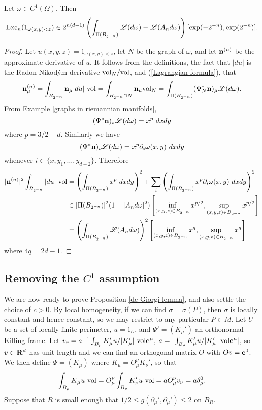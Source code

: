 \begin{lemma}\label{excess vs plateau energy}
Let $\omega \in C^1(\Omega)$. Then
\begin{equation}
    \operatorname{Exc}_n(1_{\omega(x, y) < z}) \in 2^{n(d - 1)} \left(\int_{\Pi(B_{2^{-n}})} \mathscr L(d\omega) - \mathscr L(A_n d\omega)\right) [\exp(-2^{-n}), \exp(2^{-n})]. \label{excess vs Lagrangian}
\end{equation}
\end{lemma}
\begin{proof}
Let $u(x, y, z) = 1_{\omega(x, y) < z}$, let $N$ be the graph of $\omega$, and let $\mathbf n^{(n)}$ be the approximate derivative of $u$.
It follows from the definitions, the fact that $|du|$ is the Radon-Nikod\'ym derivative $\mathrm{vol}_N/\mathrm{vol}$, and (\ref{Lagrangian formula}), that 
$$\mathbf n^{(n)}_\mu = \int_{B_{2^{-n}}} \mathbf n_\mu |du| ~\mathrm{vol} = \int_{B_{2^{-n}} \cap N} \mathbf n_\mu \mathrm{vol}_N = \int_{\Pi(B_{2^{-n}})} (\Psi_N^* \mathbf n)_\mu \mathscr L(d\omega).$$
From Example \ref{graphs in riemannian manifolds}, 
$$(\Psi^* \mathbf n)_z \mathscr L(d\omega) = x^p ~dxdy$$
where $p = 3/2 - d$. Similarly we have 
$$(\Psi^* \mathbf n)_i \mathscr L(d\omega) = x^p \partial_i \omega(x, y) ~dxdy$$
whenever $i \in \{x, y_1, \dots, y_{d - 2}\}$.
Therefore 
\begin{align*}
    |\mathbf n^{(n)}|^2 \int_{B_{2^{-n}}} |du| ~\mathrm{vol} &= \left(\int_{\Pi(B_{2^{-n}})} x^p ~dxdy\right)^2 + \sum_i \left(\int_{\Pi(B_{2^{-n}})} x^p \partial_i \omega(x, y) ~dxdy \right)^2 \\
    &\in |\Pi(B_{2^{-n}})|^2 (1 + |A_nd\omega|^2) \left[\inf_{(x, y, z) \in B_{2^{-n}}} x^{p/2}, \sup_{(x, y, z) \in B_{2^{-n}}} x^{p/2}\right] \\
    &= \left(\int_{\Pi(B_{2^{-n}})} \mathscr L(A_nd\omega)\right)^2 \left[\inf_{(x, y, z) \in B_{2^{-n}}} x^q, \sup_{(x, y, z) \in B_{2^{-n}}} x^q\right] 
\end{align*}
where $4q = 2d - 1$. 
\end{proof}


\subsection{Removing the \texorpdfstring{$C^1$}{C1} assumption}\label{proof of DGL}
We are now ready to prove Proposition \ref{de Giorgi lemma}, and also settle the choice of $c > 0$.
By local homogeneity, if we can find $\sigma = \sigma(P)$, then $\sigma$ is locally constant and hence constant, so we may restrict to any particular $P \in M$.
Let $U$ be a set of locally finite perimeter, $u = 1_U$, and $\Psi' = (K_\mu')$ an orthonormal Killing frame.
Let $v_r = a^{-1}\int_{B_\rho} K_\mu' u/|K_\mu'| ~\mathrm{vol} \mathbf e^\mu$, $a = |\int_{B_\rho} K_\mu' u/|K_\mu'| ~\mathrm{vol} \mathbf e^\mu|$, so $v \in \mathbf{R}^d$ has unit length and we can find an orthogonal matrix $O$ with $Ov = \mathbf e^0$.
We then define $\Psi = (K_\mu)$ where $K_\mu = O^\nu_\mu K_\nu'$, so that 
$$\int_{B_\rho} K_\mu u ~\mathrm{vol} = O^\nu_\mu \int_{B_\rho} K_\nu' u ~\mathrm{vol} = aO^\nu_\mu v_\nu = a\delta_\mu^0.$$
Suppose that $R$ is small enough that $1/2 \leq g(\partial_\mu', \partial_\mu') \leq 2$ on $B_R$.

